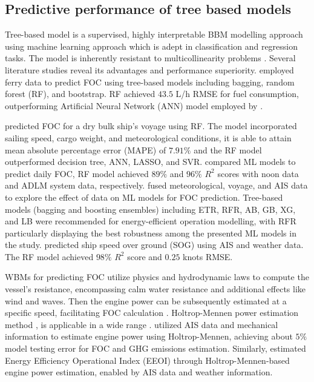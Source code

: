 \documentclass[]{interact}
\theoremstyle{plain}%
\theoremstyle{definition}
\theoremstyle{remark}
\begin{document}
\subsection{Predictive performance of tree based models}\label{sec:perf_tree_litreview}

Tree-based model is a supervised, highly interpretable BBM modelling approach using machine learning approach which is adept in classification and regression tasks. The model is inherently resistant to multicollinearity problems \citep{Yan.2021}.  Several literature studies reveal its advantages and performance superiority. \citet{Soner.2018} employed ferry data to predict FOC using tree-based models including bagging, random forest (RF), and bootstrap. RF achieved $43.5$ L/h RMSE for fuel consumption, outperforming Artificial Neural Network (ANN) model employed by \citet{Petersen.2012}.

\citet{Yan.2020} predicted FOC for a dry bulk ship's voyage using RF. The model incorporated sailing speed, cargo weight, and meteorological conditions, it is able to attain mean absolute percentage error (MAPE) of $7.91\%$ and the RF model outperformed decision tree, ANN, LASSO, and SVR. \citet{Gkerekos.2019} compared ML models to predict daily FOC, RF model achieved $89\%$ and $96\%$ $R^2$ scores with noon data and ADLM system data, respectively. \citet{Li.2022} fused meteorological, voyage, and AIS data to explore the effect of data on ML models for FOC prediction. Tree-based models (bagging and boosting ensembles) including ETR, RFR, AB, GB, XG, and LB were recommended for energy-efficient operation modelling, with RFR particularly displaying the best robustness among the presented ML models in the study. \citet{Abebe.2020} predicted ship speed over ground (SOG) using AIS and weather data. The RF model achieved $98\%$ $R^2$ score and $0.25$ knots RMSE.

WBMs for predicting FOC utilize physics and hydrodynamic laws to compute the vessel's resistance, encompassing calm water resistance and additional effects like wind and waves. Then the engine power can be subsequently estimated at a specific speed, facilitating FOC calculation \citep{haranen2016white}. Holtrop-Mennen power estimation method \citet{Holtrop.1984}, is applicable in a wide range \citep{Rakke.2016,Kim.2020b}. \citet{Rakke.2016} utilized AIS data and mechanical information to estimate engine power using Holtrop-Mennen, achieving about $5\%$ model testing error for FOC and GHG emissions estimation. Similarly, \citet{Kim.2020b} estimated Energy Efficiency Operational Index (EEOI) through Holtrop-Mennen-based engine power estimation, enabled by AIS data and weather information.
\end{document}
